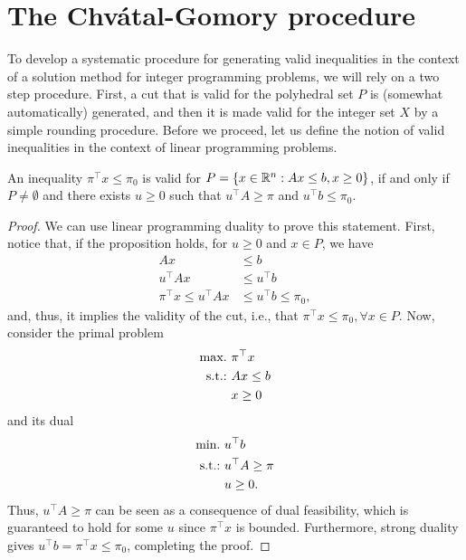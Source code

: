 \section{The Chv\'atal-Gomory procedure}

To develop a systematic procedure for generating valid inequalities in the context of a solution method for integer programming problems, we will rely on a two step procedure. First, a cut that is valid for the polyhedral set $P$ is (somewhat automatically) generated, and then it is made valid for the integer set $X$ by a simple rounding procedure. Before we proceed, let us define the notion of valid inequalities in the context of linear programming problems.

\begin{proposition} \label{p1c10:prop:valid_inequality_LP}
	An inequality $\pi^\top x \leq \pi_0$ is valid for $P = \left\{ x \in \mathbb{R}^n : Ax \leq b, x \geq 0 \right \}$, if and only if $P \neq \emptyset$ and there exists $u \geq 0$ such that $u^\top A \geq \pi$ and $u^\top b \leq \pi_0$.
\end{proposition}

\begin{proof}
	We can use linear programming duality to prove this statement. First, notice that, if the proposition holds, for $u \ge 0$ and $x \in P$, we have 
	\begin{align*}
		Ax & \le b \\
		u^\top Ax & \le u^\top b \\
		\pi ^\top x \le u^\top Ax & \le u^\top b \le \pi_0,
	\end{align*}
	and, thus, it implies the validity of the cut, i.e., that $\pi^\top x \leq \pi_0, \forall x \in P$. Now, consider the primal problem
	\begin{align*}
		\mathop{\text{max.~}} & \pi ^\top x \\
		\mathop{\text{s.t.:~}}   & Ax \leq b \\
		      & x \geq 0
	\end{align*}
	and its dual 
	\begin{align*}
		\mathop{\text{min.~}} & u^\top b \\
		\mathop{\text{s.t.:~}}   & u^\top A \geq \pi \\
		      & u \geq 0. 
	\end{align*}
	Thus, $u^\top A\geq \pi$ can be seen as a consequence of dual feasibility, which is guaranteed to hold for some $u$ since $\pi^\top x$ is bounded. Furthermore, strong duality gives $u^\top b = \pi ^\top x \leq \pi_0$, completing the proof. 
\end{proof}

